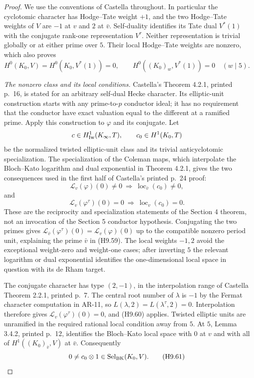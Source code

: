 \begin{proof}
We use the conventions of Castella throughout. In particular the
cyclotomic character has Hodge--Tate weight $+1$, and the two
Hodge--Tate weights of $V$ are $-1$ at $v$ and $2$ at $\bar v$.
Self-duality identifies its Tate dual $V^*(1)$ with the conjugate
rank-one representation $V^\tau$. Neither representation is
trivial globally or at either prime over $5$. Their local
Hodge--Tate weights are nonzero, which also proves
\[
 H^0(K_0,V)=H^0(K_0,V^*(1))=0,
 \qquad H^0((K_0)_w,V^*(1))=0\quad(w\mid5).                \tag{H9.58}
\]

\emph{The nonzero class and its local conditions.}
Castella's Theorem 4.2.1, printed p.~16, is stated for an arbitrary
self-dual Hecke character. Its elliptic-unit construction starts
with any prime-to-$p$ conductor ideal; it has no requirement that
the conductor have exact valuation equal to the different at a
ramified prime. Apply this construction to $\varphi$ and its
conjugate. Let
\[
 c\in H^1_{\rm Iw}(K_\infty,T),\qquad
 c_0\in H^1(K_0,T)
\]
be the normalized twisted elliptic-unit class and its trivial
anticyclotomic specialization. The specialization of the Coleman
maps, which interpolate the Bloch--Kato logarithm and dual
exponential in Theorem 4.2.1, gives the two consequences used in
the first half of Castella's printed p.~24 proof:
\[
 \mathcal L_v(\varphi)(0)\ne0
       \ \Longrightarrow\ \operatorname{loc}_{\bar v}(c_0)\ne0,
                                                               \tag{H9.59}
\]
and
\[
 \mathcal L_v(\varphi^\tau)(0)=0
       \ \Longrightarrow\ \operatorname{loc}_{v}(c_0)=0.
                                                               \tag{H9.60}
\]
These are the reciprocity and specialization statements of the
Section 4 theorem, not an invocation of the Section 5 conductor
hypothesis. Conjugating the two primes gives
$\mathcal L_{\bar v}(\varphi^\tau)(0)=\mathcal L_v(\varphi)(0)$
up to the compatible nonzero period unit, explaining the prime
$\bar v$ in (H9.59). The local weights $-1,2$ avoid the exceptional
weight-zero and weight-one cases; after inverting $5$ the relevant
logarithm or dual exponential identifies the one-dimensional local
space in question with its de Rham target.

The conjugate character has type $(2,-1)$, in the interpolation
range of Castella Theorem 2.2.1, printed p.~7. The central root
number of $\lambda$ is $-1$ by the Fermat character computation
in AR-11, so $L(\lambda,2)=L(\lambda^\tau,2)=0$.
Interpolation therefore gives
$\mathcal L_v(\varphi^\tau)(0)=0$, and (H9.60) applies.
Twisted elliptic units are unramified in the required rational
local condition away from $5$. At $5$, Lemma 3.4.2, printed p.~12,
identifies the Bloch--Kato local space with $0$ at $v$ and with
all of $H^1((K_0)_{\bar v},V)$ at $\bar v$. Consequently
\[
       0\ne c_0\otimes1
             \in\operatorname{Sel}_{\rm BK}(K_0,V).        \tag{H9.61}
\]


\end{proof}
